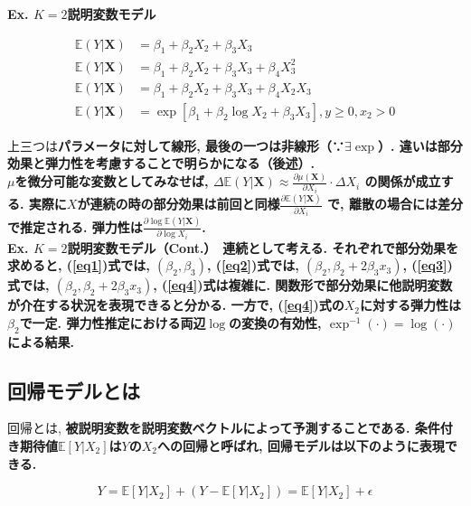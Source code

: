 \documentclass[paper=a4paper,fontsize=10pt]{jlreq}
\begin{document}
\rmfamily\mcfamily\bfseries{Ex. $K=2$説明変数モデル}\mdseries　

\begin{align}
  \label{eq1}
  \mathbb{E}(Y|\mathbf{X})&=\beta_1+\beta_2X_{2}+\beta_3X_{3}\\
  \label{eq2}
  \mathbb{E}(Y|\mathbf{X})&=\beta_1+\beta_2X_{2}+\beta_3X_{3}+\beta_4X_{3}^{2}\\
  \label{eq3}
  \mathbb{E}(Y|\mathbf{X})&=\beta_1+\beta_2X_{2}+\beta_3X_{3}+\beta_4X_{2}X_{3}\\
  \label{eq4}
  \mathbb{E}(Y|\mathbf{X})&=\exp[\beta_1+\beta_2\log X_{2}+\beta_3X_{3}], y ≥ 0, x_{2} > 0
\end{align}

上三つは\rmfamily\mcfamily\bfseries{パラメータに対して線形}\mdseries , 最後の一つは非線形（∵$\exists\exp$）. 違いは部分効果と弾力性を考慮することで明らかになる（後述）.\\

$\mu$を微分可能な変数としてみなせば, $\Delta\mathbb{E}(Y|\mathbf{X})\approx \frac{\partial \mu(\mathbf{X})}{\partial X_i}\cdot \Delta X_i$ の関係が成立する. 実際に$X$が連続の時の部分効果は前回と同様$\frac{\partial \mathbb{E}(Y|\mathbf{X})}{\partial X_i}$ で, 離散の場合には差分で推定される. 弾力性は$\frac{\partial \log \mathbb{E}(Y|\mathbf{X})}{\partial \log X_i}$.\\

\rmfamily\mcfamily\bfseries{Ex. $K=2$説明変数モデル（Cont.）}\mdseries　連続として考える. それぞれで部分効果を求めると, (\ref{eq1})式では, $(\beta_2, \beta_3)$, (\ref{eq2})式では, $(\beta_2, \beta_2+2\beta_3x_3)$, (\ref{eq3})式では, $(\beta_2, \beta_2+2\beta_3x_3)$, (\ref{eq4})式は複雑に. 関数形で部分効果に他説明変数が介在する状況を表現できると分かる. 一方で,  (\ref{eq4})式の$X_2$に対する弾力性は$\beta_2$で一定. 弾力性推定における両辺$\log$の変換の有効性, $\exp^{-1}(\cdot)=\log(\cdot)$による結果.\\

\subsection{回帰モデルとは}
回帰とは,  \rmfamily\mcfamily\bfseries{被説明変数を説明変数ベクトルによって予測}\mdseries することである. 条件付き期待値$\mathbb{E}[Y|X_{2}]$は\rmfamily\mcfamily\bfseries{$Y$の$X_{2}$への回帰}\mdseries と呼ばれ, 回帰モデルは以下のように表現できる. 

\begin{equation*}
  Y = \mathbb{E}[Y|X_{2}]+(Y-\mathbb{E}[Y|X_{2}])=\mathbb{E}[Y|X_{2}]+\epsilon
\end{equation*}
\end{document}
